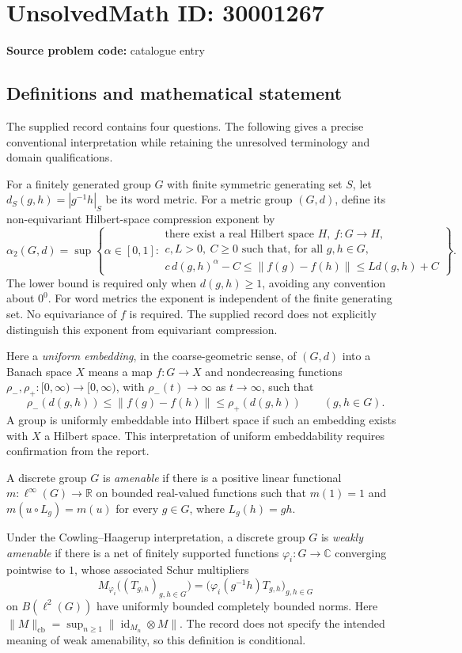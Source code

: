 \documentclass[11pt]{article}
\newcommand{\R}{\mathbb{R}}
\newcommand{\C}{\mathbb{C}}
\begin{document}
\section*{UnsolvedMath ID: 30001267}
\textbf{Source problem code:} catalogue entry
\subsection{Definitions and mathematical statement}
The supplied record contains four questions. The following gives a precise conventional interpretation while retaining the unresolved terminology and domain qualifications.

For a finitely generated group \(G\) with finite symmetric generating set \(S\), let \(d_S(g,h)=|g^{-1}h|_S\) be its word metric. For a metric group \((G,d)\), define its non-equivariant Hilbert-space compression exponent by
\[
\alpha_2(G,d)=\sup\left\{\alpha\in[0,1]:\begin{array}{l}
\text{there exist a real Hilbert space }H,\ f:G\to H,\\
 c,L>0,\ C\geq0\text{ such that, for all }g,h\in G,\\
 c\,d(g,h)^\alpha-C\leq\|f(g)-f(h)\|\leq Ld(g,h)+C
\end{array}\right\}.
\]
The lower bound is required only when \(d(g,h)\geq1\), avoiding any convention about \(0^0\). For word metrics the exponent is independent of the finite generating set. No equivariance of \(f\) is required. The supplied record does not explicitly distinguish this exponent from equivariant compression.

Here a \emph{uniform embedding}, in the coarse-geometric sense, of \((G,d)\) into a Banach space \(X\) means a map \(f:G\to X\) and nondecreasing functions \(\rho_-,\rho_+:[0,\infty)\to[0,\infty)\), with \(\rho_-(t)\to\infty\) as \(t\to\infty\), such that
\[
\rho_-(d(g,h))\leq\|f(g)-f(h)\|\leq\rho_+(d(g,h))
\qquad(g,h\in G).
\]
A group is uniformly embeddable into Hilbert space if such an embedding exists with \(X\) a Hilbert space. This interpretation of uniform embeddability requires confirmation from the report.

A discrete group \(G\) is \emph{amenable} if there is a positive linear functional \(m:\ell^\infty(G)\to\R\) on bounded real-valued functions such that \(m(1)=1\) and \(m(u\circ L_g)=m(u)\) for every \(g\in G\), where \(L_g(h)=gh\).

Under the Cowling--Haagerup interpretation, a discrete group \(G\) is \emph{weakly amenable} if there is a net of finitely supported functions \(\varphi_i:G\to\C\) converging pointwise to \(1\), whose associated Schur multipliers
\[
M_{\varphi_i}\bigl((T_{g,h})_{g,h\in G}\bigr)
 =\bigl(\varphi_i(g^{-1}h)T_{g,h}\bigr)_{g,h\in G}
\]
on \(B(\ell^2(G))\) have uniformly bounded completely bounded norms. Here \(\|M\|_{\mathrm{cb}}=\sup_{n\geq1}\|\operatorname{id}_{M_n}\otimes M\|\). The record does not specify the intended meaning of weak amenability, so this definition is conditional.
\end{document}

